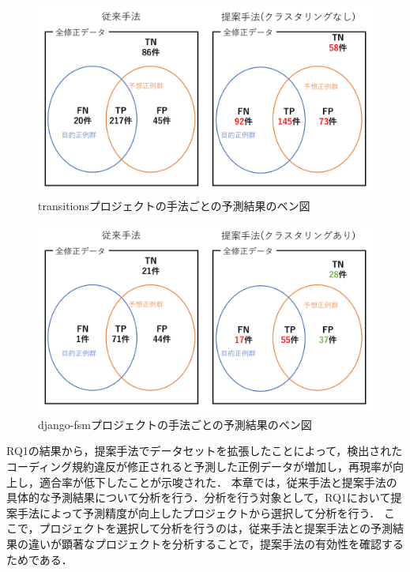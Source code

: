 \documentclass[submit,noauthor,dvipdfmx]{ipsj}
\begin{document}
\begin{figure}[bp]
	\centering
	\includegraphics[width=1\linewidth]{Kameoka_fig/benzu-transitions.pdf}
	\caption{transitionsプロジェクトの手法ごとの予測結果のベン図}
	\label{fig:transitions}
\end{figure}
\begin{figure}[bp]

	\centering
	\includegraphics[width=1\linewidth]{Kameoka_fig/benzu-django-fsm.pdf}
	\caption{django-fsmプロジェクトの手法ごとの予測結果のベン図}
	\label{fig:django-fsm}
\end{figure}

RQ1の結果から，提案手法でデータセットを拡張したことによって，検出されたコーディング規約違反が修正されると予測した正例データが増加し，再現率が向上し，適合率が低下したことが示唆された．
本章では，従来手法と提案手法の具体的な予測結果について分析を行う．分析を行う対象として，RQ1において提案手法によって予測精度が向上したプロジェクトから選択して分析を行う．
ここで，プロジェクトを選択して分析を行うのは，従来手法と提案手法との予測結果の違いが顕著なプロジェクトを分析することで，提案手法の有効性を確認するためである．
\end{document}
